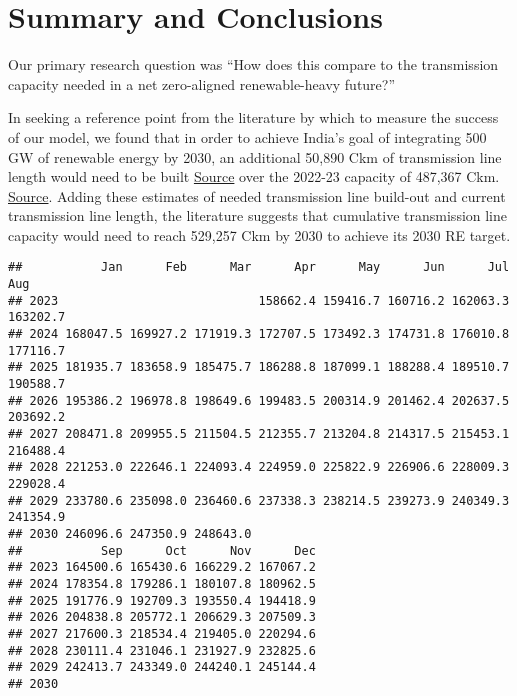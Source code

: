 \documentclass[
]{article}
\begin{document}
\hypertarget{summary-and-conclusions}{%
\section{Summary and Conclusions}\label{summary-and-conclusions}}

Our primary research question was ``How does this compare to the
transmission capacity needed in a net zero-aligned renewable-heavy
future?''

In seeking a reference point from the literature by which to measure the
success of our model, we found that in order to achieve India's goal of
integrating 500 GW of renewable energy by 2030, an additional 50,890 Ckm
of transmission line length would need to be built
\href{https://cea.nic.in/wp-content/uploads/notification/2022/12/CEA_Tx_Plan_for_500GW_Non_fossil_capacity_by_2030.pdf\#:~:text=India\%20has\%20envisaged\%20to\%20increase\%20the\%20non\%2Dfossil,energy\%20potential\%2C\%20needs\%20to\%20be\%20connected\%20to}{Source}
over the 2022-23 capacity of 487,367 Ckm.
\href{https://web.cvent.com/event/681be785-fd13-4645-8c92-3305ca1454c5/summary}{Source}.
Adding these estimates of needed transmission line build-out and current
transmission line length, the literature suggests that cumulative
transmission line capacity would need to reach 529,257 Ckm by 2030 to
achieve its 2030 RE target.

\begin{verbatim}
##           Jan      Feb      Mar      Apr      May      Jun      Jul      Aug
## 2023                            158662.4 159416.7 160716.2 162063.3 163202.7
## 2024 168047.5 169927.2 171919.3 172707.5 173492.3 174731.8 176010.8 177116.7
## 2025 181935.7 183658.9 185475.7 186288.8 187099.1 188288.4 189510.7 190588.7
## 2026 195386.2 196978.8 198649.6 199483.5 200314.9 201462.4 202637.5 203692.2
## 2027 208471.8 209955.5 211504.5 212355.7 213204.8 214317.5 215453.1 216488.4
## 2028 221253.0 222646.1 224093.4 224959.0 225822.9 226906.6 228009.3 229028.4
## 2029 233780.6 235098.0 236460.6 237338.3 238214.5 239273.9 240349.3 241354.9
## 2030 246096.6 247350.9 248643.0                                             
##           Sep      Oct      Nov      Dec
## 2023 164500.6 165430.6 166229.2 167067.2
## 2024 178354.8 179286.1 180107.8 180962.5
## 2025 191776.9 192709.3 193550.4 194418.9
## 2026 204838.8 205772.1 206629.3 207509.3
## 2027 217600.3 218534.4 219405.0 220294.6
## 2028 230111.4 231046.1 231927.9 232825.6
## 2029 242413.7 243349.0 244240.1 245144.4
## 2030
\end{verbatim}
\end{document}
